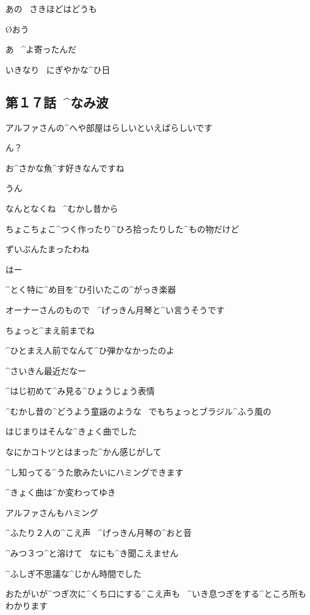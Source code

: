 \page
\K あの
\ さきほどはどうも

\O おう

\A あ
\ ^{よ}{寄}ったんだ

\A いきなり
\ にぎやかな^{ひ}{日}


\subsection{第１７話\ ^{なみ}{波}}

\page[20]
\K アルファさんの^{へや}{部屋}はらしいといえばらしいです

\page
\A ん？

\K お^{さかな}{魚}^{す}{好}きなんですね

\A うん

\A なんとなくね
\ ^{むかし}{昔}から

\page
\A ちょこちょこ^{つく}{作}ったり^{ひろ}{拾}ったりした^{もの}{物}だけど

\A ずいぶんたまったわね

\K はー

\K ^{とく}{特}に^{め}{目}を^{ひ}{引}いたこの^{がっき}{楽器}

\K オーナーさんのもので
\ ^{げっきん}{月琴}と^{い}{言}うそうです

\page
\A ちょっと^{まえ}{前}までね

\A ^{ひとまえ}{人前}でなんて^{ひ}{弾}かなかったのよ

\A ^{さいきん}{最近}だなー

\page
\K ^{はじ}{初}めて^{み}{見}る^{ひょうじょう}{表情}

\page
\K ^{むかし}{昔}の^{どうよう}{童謡}のような
\ でもちょっとブラジル^{ふう}{風}の

\K はじまりはそんな^{きょく}{曲}でした

\page
\K なにかコトツとはまった^{かん}{感}じがして

\K ^{し}{知}ってる^{うた}{歌}みたいにハミングできます

\page
\K ^{きょく}{曲}は^{か}{変}わってゆき

\K アルファさんもハミング

\K ^{ふたり}{２人}の^{こえ}{声}
\ ^{げっきん}{月琴}の^{おと}{音}

\K ^{みつ}{３つ}^{と}{溶}けて
\ なにも^{き}{聞}こえません

\page[30]
\K ^{ふしぎ}{不思議}な^{じかん}{時間}でした

\K おたがいが^{つぎ}{次}に^{くち}{口}にする^{こえ}{声}も
\ ^{いき}{息}つぎをする^{ところ}{所}もわかります

